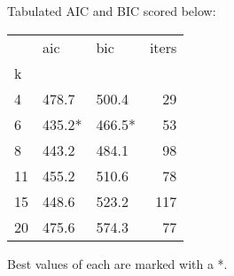 Tabulated AIC and BIC scored below:
\vspace{4mm}

\begin{tabular}{lllr}
\toprule
{} &     aic &     bic &  iters \\
k  &         &         &        \\
\midrule
4  &   478.7 &   500.4 &     29 \\
6  &  435.2* &  466.5* &     53 \\
8  &   443.2 &   484.1 &     98 \\
11 &   455.2 &   510.6 &     78 \\
15 &   448.6 &   523.2 &    117 \\
20 &   475.6 &   574.3 &     77 \\
\bottomrule
\end{tabular}


\vspace{4mm}
\noindent Best values of each are marked with a *.

